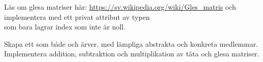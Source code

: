\Subtask Läs om glesa matriser här: \href{https://sv.wikipedia.org/wiki/Gles_matris}{https://sv.wikipedia.org/wiki/Gles\_matris} och implementera  med ett privat attribut av typen \\  som bara lagrar index som inte är noll.

\Subtask Skapa ett  som både  och  ärver, med lämpliga abstrakta och konkreta medlemmar. Implementera addition, subtraktion och multiplikation av täta och glesa matriser.

%
%
